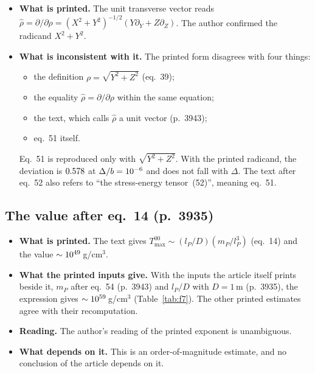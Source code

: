 \begin{itemize}
\item \textbf{What is printed.} The unit transverse vector reads $\hat\rho = \partial/\partial\rho = (X^2+Y^2)^{-1/2}(Y\partial_Y + Z\partial_Z)$. The author confirmed the radicand $X^2+Y^2$.
\item \textbf{What is inconsistent with it.} The printed form disagrees with four things:
  \begin{itemize}
  \item the definition $\rho = \sqrt{Y^2+Z^2}$ (eq.~39);
  \item the equality $\hat\rho = \partial/\partial\rho$ within the same equation;
  \item the text, which calls $\hat\rho$ a unit vector (p.~3943);
  \item eq.~51 itself.
  \end{itemize}
  Eq.~51 is reproduced only with $\sqrt{Y^2+Z^2}$. With the printed radicand, the deviation is $0.578$ at $\Delta/b = 10^{-6}$ and does not fall with $\Delta$. The text after eq.~52 also refers to ``the stress-energy tensor~(52)'', meaning eq.~51.
\end{itemize}

\subsection{The value after eq.~14 (p.~3935)}

\begin{itemize}
\item \textbf{What is printed.} The text gives $T^{00}_{\max} \sim (l_P/D)(m_P/l_P^3)$ (eq.~14) and the value $\sim 10^{49}$\,g/cm$^3$.
\item \textbf{What the printed inputs give.} With the inputs the article itself prints beside it, $m_P$ after eq.~54 (p.~3943) and $l_P/D$ with $D = 1$\,m (p.~3935), the expression gives $\sim 10^{59}$\,g/cm$^3$ (Table~\ref{tab:f7}). The other printed estimates agree with their recomputation.
\item \textbf{Reading.} The author's reading of the printed exponent is unambiguous.
\item \textbf{What depends on it.} This is an order-of-magnitude estimate, and no conclusion of the article depends on it.
\end{itemize}

\begin{table}[!tbp]
\centering\small

\caption{F7: estimates printed in Kim and Thorne, with page, against the arithmetic of the inputs printed with them. A dash means the value is not printed in Kim and Thorne; only the recomputation is shown. \FSevenNotInKT{}; it is used only as a cross-check of the arithmetic.}
\label{tab:f7}
\end{table}

